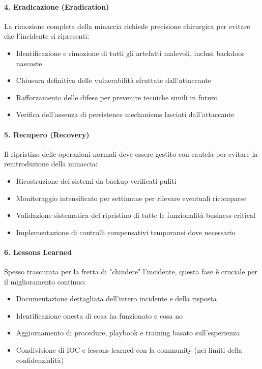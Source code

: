 \paragraph{4. Eradicazione (Eradication)}
La rimozione completa della minaccia richiede precisione chirurgica per evitare che l'incidente si ripresenti:
\begin{itemize}
    \item Identificazione e rimozione di tutti gli artefatti malevoli, inclusi backdoor nascoste
    \item Chiusura definitiva delle vulnerabilità sfruttate dall'attaccante
    \item Rafforzamento delle difese per prevenire tecniche simili in futuro
    \item Verifica dell'assenza di persistence mechanisms lasciati dall'attaccante
\end{itemize}

\paragraph{5. Recupero (Recovery)}
Il ripristino delle operazioni normali deve essere gestito con cautela per evitare la reintroduzione della minaccia:
\begin{itemize}
    \item Ricostruzione dei sistemi da backup verificati puliti
    \item Monitoraggio intensificato per settimane per rilevare eventuali ricomparse
    \item Validazione sistematica del ripristino di tutte le funzionalità business-critical
    \item Implementazione di controlli compensativi temporanei dove necessario
\end{itemize}

\paragraph{6. Lessons Learned}
Spesso trascurata per la fretta di "chiudere" l'incidente, questa fase è cruciale per il miglioramento continuo:
\begin{itemize}
    \item Documentazione dettagliata dell'intero incidente e della risposta
    \item Identificazione onesta di cosa ha funzionato e cosa no
    \item Aggiornamento di procedure, playbook e training basato sull'esperienza
    \item Condivisione di IOC e lessons learned con la community (nei limiti della confidenzialità)
\end{itemize}


